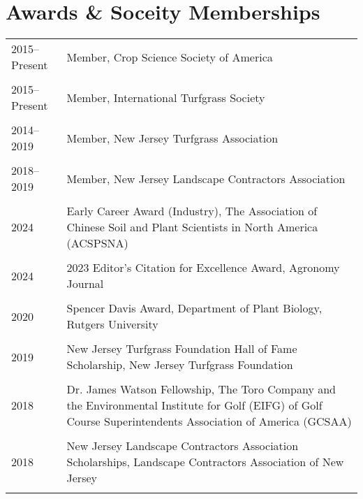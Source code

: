 \documentclass[letterpaper,11pt, english]{article}
\begin{document}
\section{Awards \& Soceity Memberships}
\begin{flushleft}
\begin{tabularx}{\textwidth}{@{}lX@{}}
    2015--Present \hspace{0.5cm} & Member, Crop Science Society of America \\
    \\[-0.2cm] 
    2015--Present & Member, International Turfgrass Society \\
    \\[-0.2cm] 
    2014--2019  & Member, New Jersey Turfgrass Association \\
    \\[-0.2cm] 
    2018--2019  & Member, New Jersey Landscape Contractors Association \\
    \\[-0.2cm] 
    2024 \hspace{1cm} & Early Career Award (Industry), The Association of Chinese Soil and Plant Scientists in North America (ACSPSNA) \\
    \\[-0.2cm] 
    2024 \hspace{1cm} & 2023 Editor’s Citation for Excellence Award, Agronomy Journal \\
    \\[-0.2cm] 
    2020 \hspace{1cm} & Spencer Davis Award, Department of Plant Biology, Rutgers University \\
    \\[-0.2cm] 
    2019 \hspace{1cm} & New Jersey Turfgrass Foundation Hall of Fame Scholarship, New Jersey Turfgrass Foundation \\
    \\[-0.2cm] 
    2018 \hspace{1cm} & Dr. James Watson Fellowship, The Toro Company and the Environmental Institute for Golf (EIFG) of Golf Course Superintendents Association of America (GCSAA) \\
    \\[-0.2cm] 
    2018 \hspace{1cm} & New Jersey Landscape Contractors Association Scholarships, Landscape Contractors Association of New Jersey \\
    \\[-0.2cm] 

\end{tabularx}
\end{flushleft}
\end{document}
